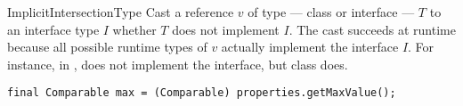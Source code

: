 \begin{pattern}{ImplicitIntersectionType}
Cast a reference $v$ of type --- class or interface --- $T$ to an
interface type $I$ whether $T$ does not implement $I$.
The cast succeeds at runtime because all possible runtime types of $v$
actually implement the interface $I$.
For instance, in ,  does not
implement the  interface, but class  does.

\instances

\begin{lstlisting}[style=java,caption=From \url{http://bit.ly/2FQOt4v}]
final Comparable max = (Comparable) properties.getMaxValue();
\end{lstlisting}
\end{pattern}